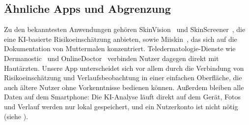 \subsection{Ähnliche Apps und Abgrenzung}
\label{sec:abgrenzung-apps}

Zu den bekanntesten Anwendungen gehören SkinVision~\cite{app-skinvision} und SkinScreener~\cite{app-skinscreener}, die eine KI-basierte Risikoeinschätzung anbieten, sowie Miiskin~\cite{app-miiskin}, das sich auf die Dokumentation von Muttermalen konzentriert. Teledermatologie-Dienste wie Dermanostic~\cite{app-dermanostic} und OnlineDoctor~\cite{app-onlinedoctor} verbinden Nutzer dagegen direkt mit Hautärzten. Unsere App unterscheidet sich vor allem durch die Verbindung von Risikoeinschätzung und Verlaufsbeobachtung in einer einfachen Oberfläche, die auch ältere Nutzer ohne Vorkenntnisse bedienen können. Außerdem bleiben alle Daten auf dem Smartphone: Die KI-Analyse läuft direkt auf dem Gerät, Fotos und Verlauf werden nur lokal gespeichert, und ein Nutzerkonto ist nicht nötig (siehe ).
